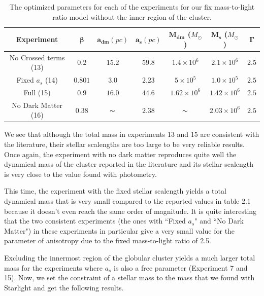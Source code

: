 \begin{table}[H]
\centering
\begin{tabular}{| c| c| c| c| c| c| c|}
    \hline
    \textbf{Experiment} & $\mathbf{\beta}$ & $\mathbf{a_{dm}} (pc)$ & $\mathbf{a_{s}} (pc)$ & $\mathbf{M_{dm}}$ ($M_{\odot}$) & $\mathbf{M_{s}}$ ($M_{\odot}$) & $\mathbf{\Gamma}$\\ \hline
	No Crossed terms (13) & $0.2$ &	$15.2$ &	$59.8$ &	$1.4 \times 10^{6}$ &	$2.1 \times 10^{6}$ &	$2.5$\\ \hline
	Fixed $a_s$ (14) &	$0.801$ &	$3.0$ &	$\mathbf{2.23}$ &	$5 \times 10^{5}$ &	$1.0 \times 10 ^{5}$ &	$2.5$\\ \hline
	Full (15) &	$0.9$ &	$16.0$ &	$44.6$ &	$1.62 \times 10^{6}$ &	$1.42 \times 10^{6}$ &	$2.5$\\ \hline
	No Dark Matter (16) &	$0.38$ &	$\thicksim$ & $ 2.38$ &	$\thicksim$ & $  2.03 \times 10^{6}$ & 	$2.5$\\
    \hline
  \end{tabular} 
\caption[Optimized parameters for our fix mass-to-light ratio model without the inner region.]{The optimized parameters for each of the experiments for our fix mass-to-light ratio model without the inner region of the cluster.}
\end{table} 

We see that although the total mass in experiments 13 and 15 are consistent with the literature, their stellar scalengths are too large to be very reliable results. Once again, the experiment with no dark matter reproduces quite well the dynamical mass of the cluster reported in the literature and its stellar scalength is very close to the value found with photometry. 

This time, the experiment with the fixed stellar scalength yields a total dynamical mass that is very small compared to the reported values in table 2.1 because it doesn't even reach the same order of magnitude. It is quite interesting that the two consistent experiments (the ones with ``Fixed $a_s$" and ``No Dark Matter") in these experiments in particular give a very small value for the parameter of anisotropy  due to the fixed mass-to-light ratio of 2.5. 

Excluding the innermost region of the globular cluster yields a much larger total mass for the experiments where $a_s$ is also a free parameter (Experiment 7 and 15). Now, we set the constraint of a stellar mass to the mass that we found with Starlight and get the following results.

